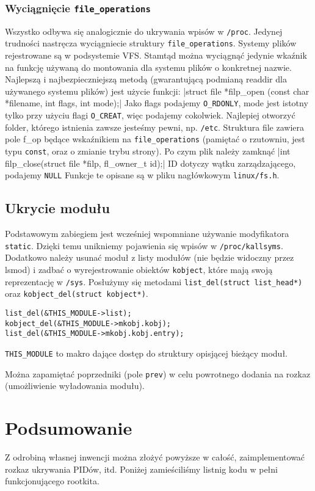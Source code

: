 \documentclass[a4paper]{article}
\begin{document}
\subsubsection{Wyciągnięcie \texttt{file\_operations}}
Wszystko odbywa się analogicznie do ukrywania wpisów w \texttt{/proc}. Jedynej
trudności nastręcza wyciągniecie struktury \texttt{file\_operations}. Systemy
plików rejestrowane są w podsystemie VFS. Stamtąd można wyciągnąć jedynie
wkaźnik na funkcję używaną do montowania dla systemu plików o konkretnej
nazwie. Najlepszą i najbezpieczniejszą metodą (gwarantującą podmianą readdir
dla używanego systemu plików) jest użycie funkcji:
|struct file *filp_open (const char *filename, int flags, int mode);|
Jako flags podajemy \texttt{O\_RDONLY}, mode jest istotny tylko przy użyciu
flagi \texttt{O\_CREAT}, więc podajemy cokolwiek. Najlepiej otworzyć folder,
którego istnienia zawsze jesteśmy pewni, np. \texttt{/etc}. Struktura file
zawiera pole f\_op będące wskaźnikiem na \texttt{file\_operations} (pamiętać o
rzutowniu, jest typu \texttt{const}, oraz o zmianie trybu strony). Po czym
plik należy zamknąć
|int filp_close(struct file *filp, fl_owner_t id);|
ID dotyczy wątku zarządzającego, podajemy \texttt{NULL} Funkcje te opisane są
w pliku nagłówkowym \texttt{linux/fs.h}.

\subsection{Ukrycie modułu}
Podstawowym zabiegiem jest wcześniej wspomniane używanie modyfikatora
\texttt{static}. Dzięki temu unikniemy pojawienia się wpisów w
\texttt{/proc/kallsyms}. Dodatkowo należy usunać moduł z listy modułów (nie
będzie widoczny przez lsmod) i zadbać o wyrejestrowanie obiektów
\texttt{kobject}, które mają swoją reprezentację w \texttt{/sys}. Posłużymy
się metodami \texttt{list\_del(struct list\_head*)} oraz
\texttt{kobject\_del(struct kobject*)}.

\begin{verbatim}
list_del(&THIS_MODULE->list);
kobject_del(&THIS_MODULE->mkobj.kobj);
list_del(&THIS_MODULE->mkobj.kobj.entry);
\end{verbatim}
\texttt{THIS\_MODULE} to makro dające dostęp do struktury opisjącej bieżący
moduł.

Można zapamiętać poprzedniki (pole \texttt{prev}) w celu powrotnego dodania na
rozkaz (umożliwienie wyładowania modułu).

\section{Podsumowanie}
Z odrobiną własnej inwencji można złożyć powyższe w całość, zaimplementować
rozkaz ukrywania PIDów, itd. Poniżej zamieściliśmy listnig kodu w pełni
funkcjonującego rootkita.
\end{document}
